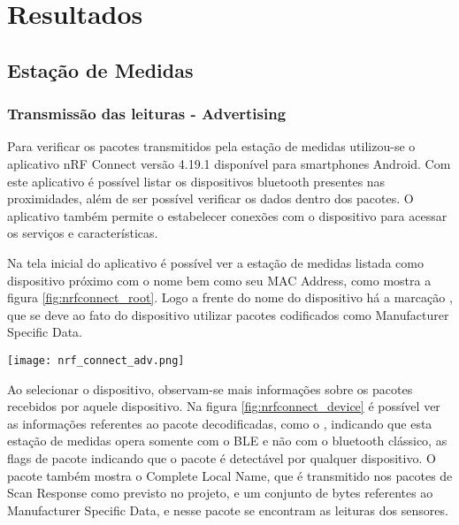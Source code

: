 \section{Resultados}

\subsection{Estação de Medidas}

\subsubsection{Transmissão das leituras - Advertising}

Para verificar os pacotes transmitidos pela estação de medidas utilizou-se o
aplicativo nRF Connect versão 4.19.1 disponível para smartphones Android. Com
este aplicativo é possível listar os dispositivos bluetooth presentes nas
proximidades, além de ser possível verificar os dados dentro dos pacotes. O
aplicativo também permite o estabelecer conexões com o dispositivo para acessar
os serviços e características.

Na tela inicial do aplicativo é possível ver a estação de medidas listada como
dispositivo próximo com o nome  bem como seu MAC Address,
como mostra a figura \ref{fig:nrfconnect_root}. Logo a frente do nome do
dispositivo há a marcação , que se deve ao fato do
dispositivo utilizar pacotes codificados como Manufacturer Specific Data.

\begin{center}
	\centering 
	\texttt{[image: nrf\_connect\_adv.png]}
	\label{fig:nrfconnect_root}
\end{center} 

Ao selecionar o dispositivo, observam-se mais informações sobre os pacotes
recebidos por aquele dispositivo. Na figura \ref{fig:nrfconnect_device} é
possível ver as informações referentes ao pacote decodificadas, como o
, indicando que esta estação de medidas opera somente com
o BLE e não com o bluetooth clássico, as flags de pacote indicando que o pacote
é detectável por qualquer dispositivo. O pacote também mostra o Complete Local
Name, que é transmitido nos pacotes de Scan Response como previsto no projeto, e
um conjunto de bytes referentes ao Manufacturer Specific Data, e nesse pacote se
encontram as leituras dos sensores.

